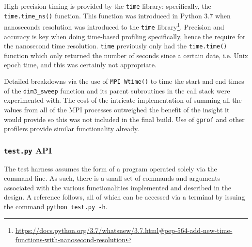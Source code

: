 \documentclass[conference]{IEEEtran}
\begin{document}
High-precision timing is provided by the \texttt{time} library: specifically, the \texttt{time.time\_ns()} function. This function was introduced in Python 3.7 when nanoseconds resolution was introduced to the \texttt{time} library\footnote{\url{https://docs.python.org/3.7/whatsnew/3.7.html#pep-564-add-new-time-functions-with-nanosecond-resolution}}. Precision and accuracy is key when doing time-based profiling specifically, hence the require for the nanosecond time resolution. \texttt{time} previously only had the \texttt{time.time()} function which only returned the number of seconds since a certain date, i.e. Unix epoch time, and this was certainly not appropriate. 

Detailed breakdowns via the use of \texttt{MPI\_Wtime()} to time the start and end times of the \texttt{dim3\_sweep} function and its parent subroutines in the call stack were experimented with. The cost of the intricate implementation of summing all the values from all of the MPI processes outweighed the benefit of the insight it would provide so this was not included in the final build. Use of \texttt{gprof} and other profilers provide similar functionality already.


\subsubsection{\texttt{test.py} API}
\label{subsubsec:testapi}

The test harness assumes the form of a program operated solely via the command-line. As such, there is a small set of commands and arguments associated with the various functionalities implemented and described in the design. A reference follows, all of which can be accessed via a terminal by issuing the command \texttt{python test.py -h}.
\end{document}
